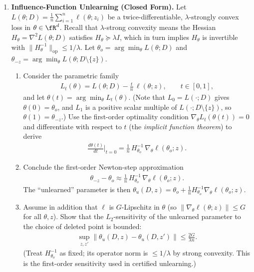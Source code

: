 \documentclass[12pt]{article}
\begin{document}
\begin{enumerate}
\item \textbf{Influence-Function Unlearning (Closed Form).}
Let $L(\theta; D) = \frac{1}{n}\sum_{i=1}^n \ell(\theta; z_i)$ be a twice-differentiable, $\lambda$-strongly convex loss in $\theta \in \fR^d$. Recall that $\lambda$-strong convexity means the Hessian $H_\theta = \nabla^2 L(\theta; D)$ satisfies $H_\theta \succeq \lambda I$, which in turn implies $H_\theta$ is invertible with $\|H_\theta^{-1}\|_{\mathrm{op}} \le 1/\lambda$. Let $\theta_o = \arg\min_\theta L(\theta; D)$ and $\theta_{-z} = \arg\min_\theta L(\theta; D \setminus \{z\})$.
\begin{enumerate}
    \item Consider the parametric family
    \begin{align*}
        L_t(\theta) = L(\theta; D) - \frac{t}{n}\,\ell(\theta; z), \qquad t \in [0, 1],
    \end{align*}
    and let $\theta(t) = \arg\min_\theta L_t(\theta)$. (Note that $L_0 = L(\cdot; D)$ gives $\theta(0) = \theta_o$, and $L_1$ is a positive scalar multiple of $L(\cdot; D \setminus \{z\})$, so $\theta(1) = \theta_{-z}$.) Use the first-order optimality condition $\nabla_\theta L_t(\theta(t)) = 0$ and differentiate with respect to $t$ (the \emph{implicit function theorem}) to derive
    \begin{align*}
        \frac{d\theta(t)}{dt}\bigg|_{t=0} = \frac{1}{n}\,H_{\theta_o}^{-1}\,\nabla_\theta \ell(\theta_o; z).
    \end{align*}

    \item Conclude the first-order Newton-step approximation
    \begin{align*}
        \theta_{-z} - \theta_o \approx \frac{1}{n}\,H_{\theta_o}^{-1}\,\nabla_\theta \ell(\theta_o; z).
    \end{align*}
    The ``unlearned'' parameter is then $\theta_u(D, z) = \theta_o + \frac{1}{n}H_{\theta_o}^{-1}\nabla_\theta \ell(\theta_o; z)$.

    \item Assume in addition that $\ell$ is $G$-Lipschitz in $\theta$ (so $\|\nabla_\theta \ell(\theta; z)\| \le G$ for all $\theta, z$). Show that the $L_2$-sensitivity of the unlearned parameter to the choice of deleted point is bounded:
    \begin{align*}
        \sup_{z, z'} \|\theta_u(D, z) - \theta_u(D, z')\| \le \frac{2 G}{\lambda n}.
    \end{align*}
    (Treat $H_{\theta_o}^{-1}$ as fixed; its operator norm is $\le 1/\lambda$ by strong convexity. This is the first-order sensitivity used in certified unlearning.)
\end{enumerate}


\end{enumerate}
\end{document}
